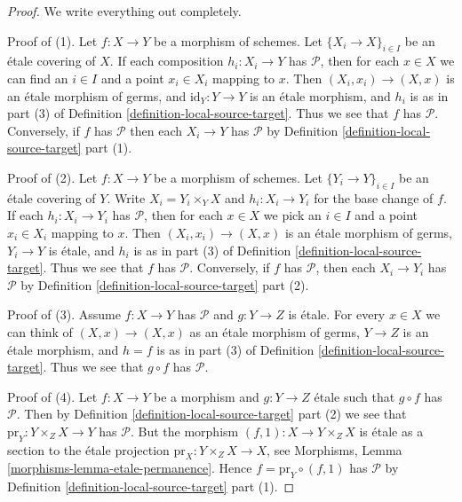 \begin{proof}
We write everything out completely.

\medskip\noindent
Proof of (1). Let $f : X \to Y$ be a morphism of schemes.
Let $\{X_i \to X\}_{i \in I}$ be an \'etale covering of $X$. If each composition
$h_i : X_i \to Y$ has $\mathcal{P}$, then for each $x \in X$ we can find
an $i \in I$ and a point $x_i \in X_i$ mapping to $x$. Then
$(X_i, x_i) \to (X, x)$ is an \'etale morphism of germs, and
$\text{id}_Y : Y \to Y$ is an \'etale morphism, and $h_i$ is as in part (3) of
Definition \ref{definition-local-source-target}.
Thus we see that $f$ has $\mathcal{P}$.
Conversely, if $f$ has $\mathcal{P}$ then each $X_i \to Y$ has
$\mathcal{P}$ by
Definition \ref{definition-local-source-target} part (1).

\medskip\noindent
Proof of (2). Let $f : X \to Y$ be a morphism of schemes.
Let $\{Y_i \to Y\}_{i \in I}$ be an \'etale covering of $Y$.
Write $X_i = Y_i \times_Y X$ and $h_i : X_i \to Y_i$ for the base change
of $f$.  If each  $h_i : X_i \to Y_i$ has $\mathcal{P}$, then for each
$x \in X$ we pick an $i \in I$ and a point $x_i \in X_i$ mapping to $x$.
Then $(X_i, x_i) \to (X, x)$ is an \'etale morphism of germs, $Y_i \to Y$ is
\'etale, and $h_i$ is as in part (3) of
Definition \ref{definition-local-source-target}.
Thus we see that $f$ has $\mathcal{P}$.
Conversely, if $f$ has $\mathcal{P}$, then each $X_i \to Y_i$ has
$\mathcal{P}$ by
Definition \ref{definition-local-source-target} part (2).

\medskip\noindent
Proof of (3). Assume $f : X \to Y$ has $\mathcal{P}$ and $g : Y \to Z$ is
\'etale. For every $x \in X$ we can think of $(X, x) \to (X, x)$ as an
\'etale morphism of germs, $Y \to Z$ is an \'etale morphism, and $h = f$ is as
in part (3) of
Definition \ref{definition-local-source-target}.
Thus we see that $g \circ f$ has $\mathcal{P}$.

\medskip\noindent
Proof of (4). Let $f : X \to Y$ be a morphism and $g : Y \to Z$ \'etale
such that $g \circ f$ has $\mathcal{P}$. Then by
Definition \ref{definition-local-source-target} part (2)
we see that $\text{pr}_Y : Y \times_Z X \to Y$ has $\mathcal{P}$. But
the morphism $(f, 1) : X \to Y \times_Z X$ is \'etale as a section to the
\'etale projection $\text{pr}_X : Y \times_Z X \to X$, see
Morphisms, Lemma \ref{morphisms-lemma-etale-permanence}.
Hence $f = \text{pr}_Y \circ (f, 1)$ has $\mathcal{P}$ by
Definition \ref{definition-local-source-target} part (1).
\end{proof}

